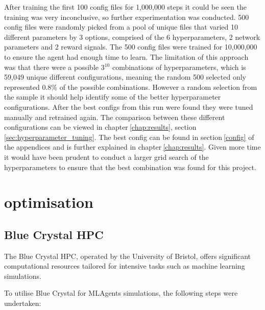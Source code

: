 After training the first 100 config files for 1,000,000 steps it could be seen the training was very inconclusive, so further experimentation was conducted. 500 config files were randomly picked from a pool of unique files that varied 10 different parameters by 3 options, comprised of the 6 hyperparameters, 2 network parameters and 2 reward signals. The 500 config files were trained for 10,000,000 to ensure the agent had enough time to learn. The limitation of this approach was that there were a possible 3$^{10}$ combinations of hyperparameters, which is 59,049 unique different configurations, meaning the random 500 selected only represented 0.8\% of the possible combinations. However a random selection from the sample it should help identify some of the better hyperparameter configurations. After the best configs from this run were found they were tuned manually and retrained again. 
The comparison between these different configurations can be viewed in chapter$~$\ref{chap:results}, section$~$\ref{sec:hyperparameter_tuning}. The best config can be found in section$~$\ref{config} of the appendices and is further explained in chapter$~$\ref{chap:results}. Given more time it would have been prudent to conduct a larger grid search of the hyperparameters to ensure that the best combination was found for this project.


\section{optimisation}


\subsection{Blue Crystal HPC}

The Blue Crystal HPC, operated by the University of Bristol, offers significant computational resources tailored for intensive tasks such as machine learning simulations. 

To utilise Blue Crystal for MLAgents simulations, the following steps were undertaken:

